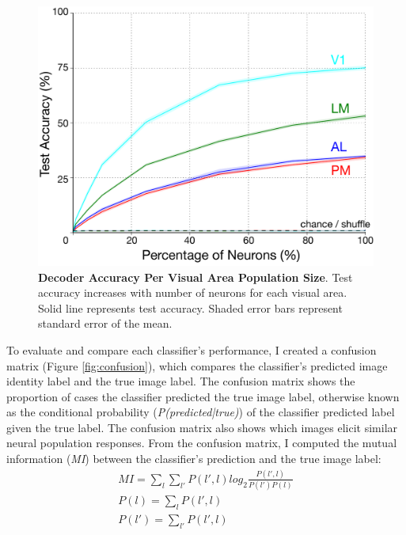 \begin{figure}
  \centering
    	\includegraphics[width=\textwidth]{Figures/chapter5/accuracy_population.png}
    \caption[Decoder Accuracy Per Visual Area Population Size]{\textbf{Decoder Accuracy Per Visual Area Population Size}. Test accuracy increases with number of neurons for each visual area. Solid line represents test accuracy. Shaded error bars represent standard error of the mean.}
  \label{fig:decodepop}
\end{figure}
To evaluate and compare each classifier’s performance, I created a confusion matrix (Figure \ref{fig:confusion}), which compares the classifier’s predicted image identity label and the true image label. The confusion matrix shows the proportion of cases the classifier predicted the true image label, otherwise known as the conditional probability (\emph{P(predicted|true)}) of the classifier predicted label given the true label. The confusion matrix also shows which images elicit similar neural population responses. From the confusion matrix, I computed the mutual information (\emph{MI}) between the classifier's prediction and the true image label: 
\begin{equation}
\begin{aligned}
MI = \sum_{l} \sum_{l'} P(l',l) log_2 \frac{P(l',l)}{P(l')P(l)} \\
P(l) = \sum_{l} P(l',l) \\
P(l') = \sum_{l'} P(l',l)
\end{aligned}
\label{eq:mutualinfo}
\end{equation}
